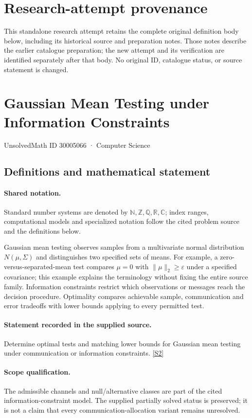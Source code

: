 \documentclass[11pt]{article}
\begin{document}
\section*{Research-attempt provenance}
This standalone research attempt retains the complete original definition body below,
including its historical source and preparation notes. Those notes describe the
earlier catalogue preparation; the new attempt and its verification are identified
separately after that body. No original ID, catalogue status, or source statement is changed.

\section{Gaussian Mean Testing under Information Constraints}\label{30005066}
{\small UnsolvedMath ID 30005066 · Computer Science}
\subsection{Definitions and mathematical statement}

\paragraph{Shared notation.}Standard number systems are denoted by $\mathbb N,\mathbb Z,\mathbb Q,\mathbb R,\mathbb C$; index ranges, computational models and specialized notation follow the cited problem source and the definitions below.


Gaussian mean testing observes samples from a multivariate normal distribution $N(\mu,\Sigma)$ and distinguishes two specified sets of means. For example, a zero-versus-separated-mean test compares $\mu=0$ with $\lVert\mu\rVert_2\geq\varepsilon$ under a specified covariance; this example explains the terminology without fixing the entire source family. Information constraints restrict which observations or messages reach the decision procedure. Optimality compares achievable sample, communication and error tradeoffs with lower bounds applying to every permitted test.
\paragraph{Statement recorded in the supplied source.}
Determine optimal tests and matching lower bounds for Gaussian mean testing under communication or information constraints. \href{https://doi.org/10.4171/owr/2022/14}{[S2]}
\paragraph{Scope qualification.}
The admissible channels and null/alternative classes are part of the cited information-constraint model. The supplied partially solved status is preserved; it is not a claim that every communication-allocation variant remains unresolved.
\end{document}
